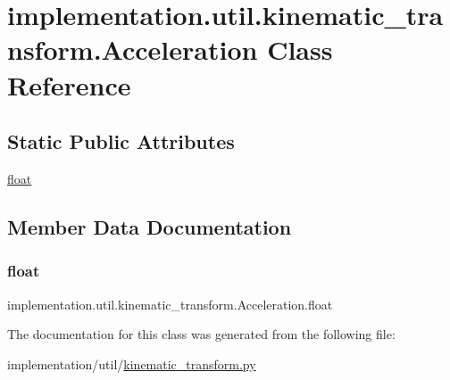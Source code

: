 \hypertarget{classimplementation_1_1util_1_1kinematic__transform_1_1_acceleration}{}\section{implementation.\+util.\+kinematic\+\_\+transform.\+Acceleration Class Reference}
\label{classimplementation_1_1util_1_1kinematic__transform_1_1_acceleration}
\subsection*{Static Public Attributes}
\begin{DoxyCompactItemize}
\item 
\hyperlink{classimplementation_1_1util_1_1kinematic__transform_1_1_acceleration_a83918ff0bb5e1fa9f86a097333549c65}{float}
\end{DoxyCompactItemize}


\subsection{Member Data Documentation}
\mbox{\label{classimplementation_1_1util_1_1kinematic__transform_1_1_acceleration_a83918ff0bb5e1fa9f86a097333549c65}} 
\subsubsection{\texorpdfstring{float}{float}}
{\footnotesize\ttfamily implementation.\+util.\+kinematic\+\_\+transform.\+Acceleration.\+float\hspace{0.3cm}{\ttfamily [static]}}



The documentation for this class was generated from the following file\+:\begin{DoxyCompactItemize}
\item 
implementation/util/\hyperlink{kinematic__transform_8py}{kinematic\+\_\+transform.\+py}\end{DoxyCompactItemize}
